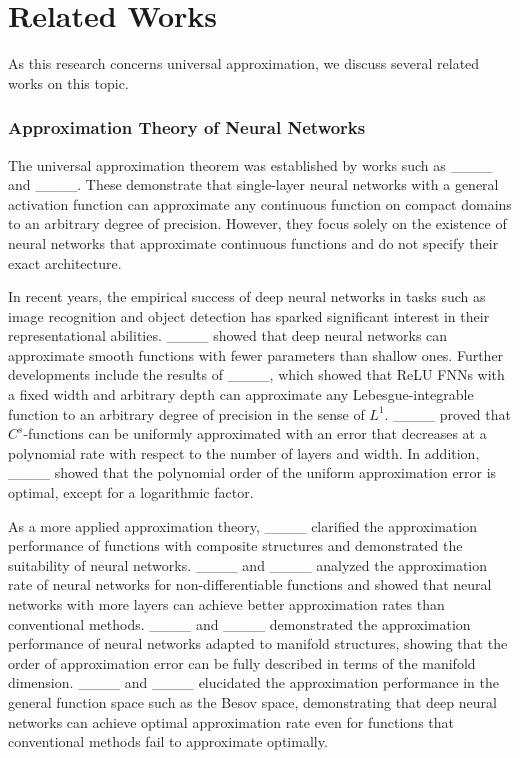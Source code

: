 \section{Related Works}
As this research concerns universal approximation, we discuss several related works on this topic.

\subsubsection{Approximation Theory of Neural Networks}
The universal approximation theorem was established by works such as ____ and ____. These demonstrate that single-layer neural networks with a general activation function can approximate any continuous function on compact domains to an arbitrary degree of precision. However, they focus solely on the existence of neural networks that approximate continuous functions and do not specify their exact architecture.

In recent years, the empirical success of deep neural networks in tasks such as image recognition and object detection has sparked significant interest in their representational abilities. ____ showed that deep neural networks can approximate smooth functions with fewer parameters than shallow ones. Further developments include the results of ____, which showed that ReLU FNNs with a fixed width and arbitrary depth can approximate any Lebesgue-integrable function to an arbitrary degree of precision in the sense of \(L^1\). ____ proved that \(C^s\)-functions can be uniformly approximated with an error that decreases at a polynomial rate with respect to the number of layers and width. In addition, ____ showed that the polynomial order of the uniform approximation error is optimal, except for a logarithmic factor.

As a more applied approximation theory, ____ clarified the approximation performance of functions with composite structures and demonstrated the suitability of neural networks. ____ and ____ analyzed the approximation rate of neural networks for non-differentiable functions and showed that neural networks with more layers can achieve better approximation rates than conventional methods.
____ and ____ demonstrated the approximation performance of neural networks adapted to manifold structures, showing that the order of approximation error can be fully described in terms of the manifold dimension. ____ and ____ elucidated the approximation performance in the general function space such as the Besov space, demonstrating that deep neural networks can achieve optimal approximation rate even for functions that conventional methods fail to approximate optimally.

